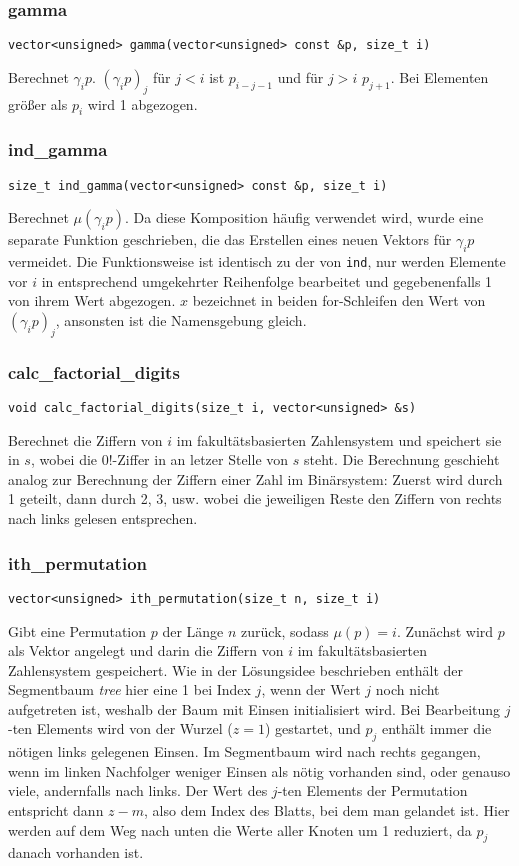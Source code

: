 \documentclass[a4paper, 10pt, ngerman]{article}
\begin{document}
\subsubsection{gamma}
\verb|vector<unsigned> gamma(vector<unsigned> const &p, size_t i)|
\medskip

\noindent Berechnet $\gamma_i p$. $(\gamma_i p)_j$ für $j < i$ ist $p_{i - j - 1}$ und für $j > i$ $p_{j + 1}$. Bei Elementen größer als $p_i$ wird 1 abgezogen.

\subsubsection{ind\_gamma}
\verb|size_t ind_gamma(vector<unsigned> const &p, size_t i)|
\medskip

\noindent Berechnet $\mu(\gamma_i p)$. Da diese Komposition häufig verwendet wird, wurde eine separate Funktion geschrieben, die das Erstellen eines neuen Vektors für $\gamma_i p$ vermeidet. Die Funktionsweise ist identisch zu der von \verb|ind|, nur werden Elemente vor $i$ in entsprechend umgekehrter Reihenfolge bearbeitet und gegebenenfalls 1 von ihrem Wert abgezogen. $x$ bezeichnet in beiden for-Schleifen den Wert von $(\gamma_i p)_j$, ansonsten ist die Namensgebung gleich.

\subsubsection{calc\_factorial\_digits}
\verb|void calc_factorial_digits(size_t i, vector<unsigned> &s)|
\medskip

\noindent Berechnet die Ziffern von $i$ im fakultätsbasierten Zahlensystem und speichert sie in $s$, wobei die $0!$-Ziffer in an letzer Stelle von $s$ steht. Die Berechnung geschieht analog zur Berechnung der Ziffern einer Zahl im Binärsystem: Zuerst wird durch 1 geteilt, dann durch 2, 3, usw. wobei die jeweiligen Reste den Ziffern von rechts nach links gelesen entsprechen.

\subsubsection{ith\_permutation}
\verb|vector<unsigned> ith_permutation(size_t n, size_t i)|
\medskip

\noindent Gibt eine Permutation $p$ der Länge $n$ zurück, sodass $\mu(p) = i$. Zunächst wird $p$ als Vektor angelegt und darin die Ziffern von $i$ im fakultätsbasierten Zahlensystem gespeichert. Wie in der Lösungsidee beschrieben enthält der Segmentbaum \emph{tree} hier eine 1 bei Index $j$, wenn der Wert $j$ noch nicht aufgetreten ist, weshalb der Baum mit Einsen initialisiert wird. Bei Bearbeitung $j$-ten Elements wird von der Wurzel ($z = 1$) gestartet, und $p_j$ enthält immer die nötigen links gelegenen Einsen. Im Segmentbaum wird nach rechts gegangen, wenn im linken Nachfolger weniger Einsen als nötig vorhanden sind, oder genauso viele, andernfalls nach links. Der Wert des $j$-ten Elements der Permutation entspricht dann $z - m$, also dem Index des Blatts, bei dem man gelandet ist. Hier werden auf dem Weg nach unten die Werte aller Knoten um 1 reduziert, da $p_j$ danach vorhanden ist.
\end{document}

